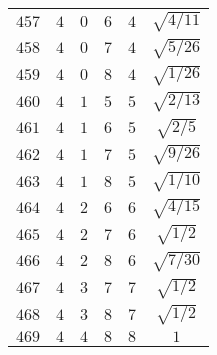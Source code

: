 \begin{table}
\begin{center}
\begin{tabular}{|c|c|c|c|c|c|}
$457$ & $4$ & $0$ & $6$ & $4$ & $\sqrt{4/11}$ \\ 
$458$ & $4$ & $0$ & $7$ & $4$ & $\sqrt{5/26}$ \\ 
$459$ & $4$ & $0$ & $8$ & $4$ & $\sqrt{1/26}$ \\ 
$460$ & $4$ & $1$ & $5$ & $5$ & $\sqrt{2/13}$ \\ 
$461$ & $4$ & $1$ & $6$ & $5$ & $\sqrt{2/5}$ \\ 
$462$ & $4$ & $1$ & $7$ & $5$ & $\sqrt{9/26}$ \\ 
$463$ & $4$ & $1$ & $8$ & $5$ & $\sqrt{1/10}$ \\ 
$464$ & $4$ & $2$ & $6$ & $6$ & $\sqrt{4/15}$ \\ 
$465$ & $4$ & $2$ & $7$ & $6$ & $\sqrt{1/2}$ \\ 
$466$ & $4$ & $2$ & $8$ & $6$ & $\sqrt{7/30}$ \\ 
$467$ & $4$ & $3$ & $7$ & $7$ & $\sqrt{1/2}$ \\ 
$468$ & $4$ & $3$ & $8$ & $7$ & $\sqrt{1/2}$ \\ 
$469$ & $4$ & $4$ & $8$ & $8$ & $1$ \\ 
\hline 
\end{tabular}
\end{center}
\end{table}
